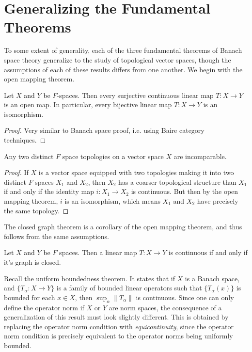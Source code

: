 \section{Generalizing the Fundamental Theorems}

To some extent of generality, each of the three fundamental theorems of Banach space theory generalize to the study of topological vector spaces, though the assumptions of each of these results differs from one another. We begin with the open mapping theorem.

\begin{theorem}
    Let $X$ and $Y$ be $F$-spaces. Then every surjective continuous linear map $T: X \to Y$ is an open map. In particular, every bijective linear map $T: X \to Y$ is an isomorphism.
\end{theorem}
\begin{proof}
    Very similar to Banach space proof, i.e. using Baire category techniques.
\end{proof}

\begin{corollary}
    Any two distinct $F$ space topologies on a vector space $X$ are incomparable.
\end{corollary}
\begin{proof}
    If $X$ is a vector space equipped with two topologies making it into two distinct $F$ spaces $X_1$ and $X_2$, then $X_2$ has a coarser topological structure than $X_1$ if and only if the identity map $i: X_1 \to X_2$ is continuous. But then by the open mapping theorem, $i$ is an isomorphism, which means $X_1$ and $X_2$ have precisely the same topology.
\end{proof}

The closed graph theorem is a corollary of the open mapping theorem, and thus follows from the same assumptions.

\begin{theorem}
    Let $X$ and $Y$ be $F$ spaces. Then a linear map $T: X \to Y$ is continuous if and only if it's graph is closed.
\end{theorem}

Recall the uniform boundedness theorem. It states that if $X$ is a Banach space, and $\{ T_\alpha: X \to Y \}$ is a family of bounded linear operators such that $\{ T_\alpha(x) \}$ is bounded for each $x \in X$, then $\sup_\alpha \| T_\alpha \|$ is continuous. Since one can only define the operator norm if $X$ or $Y$ are norm spaces, the consequence of a generalization of this result must look slightly different. This is obtained by replacing the operator norm condition with \emph{equicontinuity}, since the operator norm condition is precisely equivalent to the operator norms being uniformly bounded.

